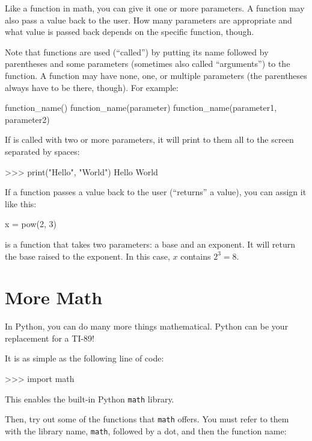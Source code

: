 \documentclass[11pt]{cselabheader}
\begin{document}
Like a function in math, you can give it one or more parameters. A function may
also pass a value back to the user. How many parameters are appropriate and what
value is passed back depends on the specific function, though.

Note that functions are used (``called'') by putting its name followed by
parentheses and some parameters (sometimes also called ``arguments'') to the
function. A function may have none, one, or multiple parameters (the parentheses
always have to be there, though). For example:

\begin{python3code}
function_name()
function_name(parameter)
function_name(parameter1, parameter2)
\end{python3code}

If  is called with two or more parameters, it will print to
them all to the screen separated by spaces:

\begin{pyconcode}
>>> print("Hello", "World")
Hello World
\end{pyconcode}

If a function passes a value back to the user (``returns'' a value), you can
assign it like this:

\begin{python3code}
x = pow(2, 3)
\end{python3code}

 is a function that takes two parameters: a base and an
exponent. It will return the base raised to the exponent. In this case, $x$
contains $2^3 = 8$.

\pagebreak

\section{More Math}

In Python, you can do many more things mathematical. Python can be your
replacement for a TI-89!

It is as simple as the following line of code:

\begin{pyconcode}
>>> import math
\end{pyconcode}

This enables the built-in Python \texttt{math} library.

Then, try out some of the functions that \texttt{math} offers. You must refer to
them with the library name, \texttt{math}, followed by a dot, and then the
function name:
\end{document}
